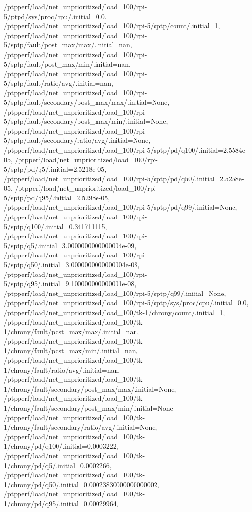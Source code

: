 {    /ptpperf/load/net_unprioritized/load_100/rpi-5/ptpd/sys/proc/cpu/.initial=0.0,
    /ptpperf/load/net_unprioritized/load_100/rpi-5/sptp/count/.initial=1,
    /ptpperf/load/net_unprioritized/load_100/rpi-5/sptp/fault/post_max/max/.initial=nan,
    /ptpperf/load/net_unprioritized/load_100/rpi-5/sptp/fault/post_max/min/.initial=nan,
    /ptpperf/load/net_unprioritized/load_100/rpi-5/sptp/fault/ratio/avg/.initial=nan,
    /ptpperf/load/net_unprioritized/load_100/rpi-5/sptp/fault/secondary/post_max/max/.initial=None,
    /ptpperf/load/net_unprioritized/load_100/rpi-5/sptp/fault/secondary/post_max/min/.initial=None,
    /ptpperf/load/net_unprioritized/load_100/rpi-5/sptp/fault/secondary/ratio/avg/.initial=None,
    /ptpperf/load/net_unprioritized/load_100/rpi-5/sptp/pd/q100/.initial=2.5584e-05,
    /ptpperf/load/net_unprioritized/load_100/rpi-5/sptp/pd/q5/.initial=2.5218e-05,
    /ptpperf/load/net_unprioritized/load_100/rpi-5/sptp/pd/q50/.initial=2.5258e-05,
    /ptpperf/load/net_unprioritized/load_100/rpi-5/sptp/pd/q95/.initial=2.5298e-05,
    /ptpperf/load/net_unprioritized/load_100/rpi-5/sptp/pd/q99/.initial=None,
    /ptpperf/load/net_unprioritized/load_100/rpi-5/sptp/q100/.initial=0.341711115,
    /ptpperf/load/net_unprioritized/load_100/rpi-5/sptp/q5/.initial=3.0000000000000004e-09,
    /ptpperf/load/net_unprioritized/load_100/rpi-5/sptp/q50/.initial=3.0000000000000004e-08,
    /ptpperf/load/net_unprioritized/load_100/rpi-5/sptp/q95/.initial=9.100000000000001e-08,
    /ptpperf/load/net_unprioritized/load_100/rpi-5/sptp/q99/.initial=None,
    /ptpperf/load/net_unprioritized/load_100/rpi-5/sptp/sys/proc/cpu/.initial=0.0,
    /ptpperf/load/net_unprioritized/load_100/tk-1/chrony/count/.initial=1,
    /ptpperf/load/net_unprioritized/load_100/tk-1/chrony/fault/post_max/max/.initial=nan,
    /ptpperf/load/net_unprioritized/load_100/tk-1/chrony/fault/post_max/min/.initial=nan,
    /ptpperf/load/net_unprioritized/load_100/tk-1/chrony/fault/ratio/avg/.initial=nan,
    /ptpperf/load/net_unprioritized/load_100/tk-1/chrony/fault/secondary/post_max/max/.initial=None,
    /ptpperf/load/net_unprioritized/load_100/tk-1/chrony/fault/secondary/post_max/min/.initial=None,
    /ptpperf/load/net_unprioritized/load_100/tk-1/chrony/fault/secondary/ratio/avg/.initial=None,
    /ptpperf/load/net_unprioritized/load_100/tk-1/chrony/pd/q100/.initial=0.0003222,
    /ptpperf/load/net_unprioritized/load_100/tk-1/chrony/pd/q5/.initial=0.0002266,
    /ptpperf/load/net_unprioritized/load_100/tk-1/chrony/pd/q50/.initial=0.00023830000000000002,
    /ptpperf/load/net_unprioritized/load_100/tk-1/chrony/pd/q95/.initial=0.00029964,
}
